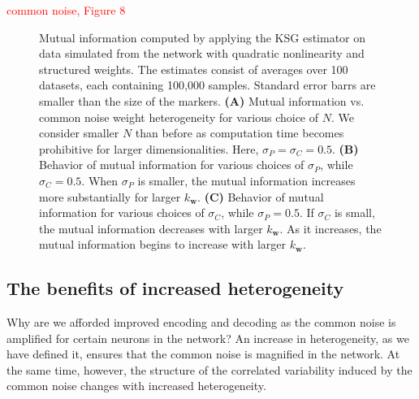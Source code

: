 \documentclass[12pt]{article}
\begin{document}
\textcolor{red}{common noise, Figure 8}
\begin{figure}[t]
	\centering
	\caption{Mutual information computed by applying the KSG estimator on data simulated from the network with quadratic nonlinearity and structured weights. The estimates consist of averages over 100 datasets, each containing 100,000 samples. Standard error barrs are smaller than the size of the markers. \textbf{(A)} Mutual information vs. common noise weight heterogeneity for various choice of $N$. We consider smaller $N$ than before as computation time becomes prohibitive for larger dimensionalities. Here, $\sigma_P =\sigma_C=0.5$. \textbf{(B)} Behavior of mutual information for various choices of $\sigma_P$, while $\sigma_C=0.5$. When $\sigma_P$ is smaller, the mutual information increases more substantially for larger $k_{\mathbf{w}}$.  \textbf{(C)}  Behavior of mutual information for various choices of $\sigma_C$, while $\sigma_P=0.5$. If $\sigma_C$ is small, the mutual information decreases with larger $k_{\mathbf{w}}$. As it increases, the mutual information begins to increase with larger $k_{\mathbf{w}}$.}  
	\label{fig:mi_squared_struct}
\end{figure}

\begin{figure}[t]
	\centering
	\caption{}  
\end{figure}
	
\subsection{The benefits of increased heterogeneity}
	Why are we afforded improved encoding and decoding as the common noise is amplified for certain neurons in the network? An increase in heterogeneity, as we have defined it, ensures that the common noise is magnified in the network. At the same time, however, the structure of the correlated variability induced by the common noise changes with increased heterogeneity. 
	
\end{document}
